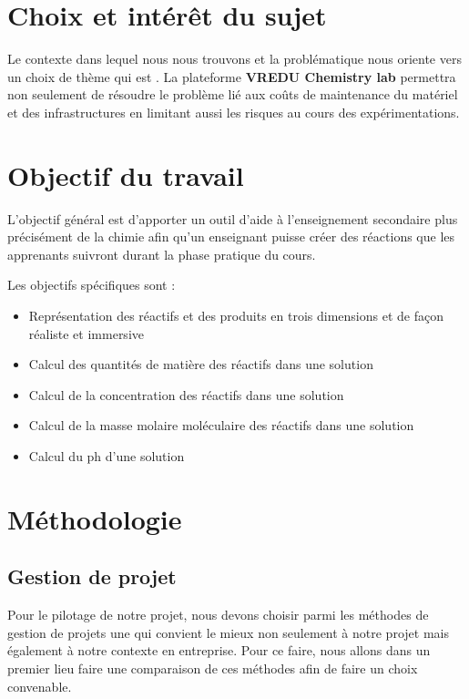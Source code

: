 \section{Choix et intérêt du sujet}

Le contexte dans lequel nous nous trouvons et la problématique nous oriente vers un
choix de thème qui est \textbf{\og \theme \fg}.
La plateforme \textbf{VREDU Chemistry lab} permettra non seulement de résoudre le problème lié aux coûts de maintenance
du matériel et des infrastructures en limitant aussi les risques au cours des expérimentations.

\section{Objectif du travail}

L’objectif général est d'apporter un outil d'aide à l'enseignement secondaire plus précisément de la chimie afin qu'un enseignant puisse créer des réactions que les apprenants suivront durant la phase pratique du cours.

Les objectifs spécifiques sont :

\begin{itemize}
	\item Représentation des réactifs et des produits en trois dimensions et de façon réaliste et immersive
	\item Calcul des quantités de matière des réactifs dans une solution
	\item Calcul de la concentration des réactifs dans une solution
	\item Calcul de la masse molaire moléculaire des réactifs dans une solution
	\item Calcul du ph d’une solution
\end{itemize}

\section{Méthodologie}

\subsection{Gestion de projet}

Pour le pilotage de notre projet, nous devons choisir parmi les méthodes de gestion de projets une qui convient le mieux non seulement à notre projet mais également à notre contexte en entreprise.
Pour ce faire, nous allons dans un premier lieu faire une comparaison de ces
méthodes afin de faire un choix convenable.

